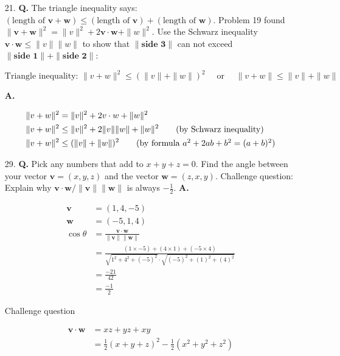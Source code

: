\documentclass[main.tex]{subfiles}
\begin{document}
\begin{enumerate}
        \item [21.] \textbf{Q.} The triangle inequality says: $(\text{length of } \bm{v} + \bm{w}) \leq ( \text{length of } \bm{v} ) + ( \text{length of } \bm{w} )$. Problem 19 found $\| \bm{v} + \bm{w} \|^2 = \|v\|^2 + 2 \bm{v} \cdot \bm{w} + \|w\|^2$. Use the Schwarz inequality $\bm{v} \cdot \bm{w} \leq \|v\| \|w\|$ to show that $\|\textbf{side 3}\|$ can not exceed $\|\textbf{side 1}\| + \|\textbf{side 2}\|$: 
        
        $$\text{Triangle inequality: }\|v+w\|^{2} \leq(\|v\|+\|w\|)^{2} \quad \text{ or } \quad\|v+w\| \leq\|v\|+\|w\|$$ 
        
        \textbf{A.}
        
        
        \begin{align*}
            \|v+w\|^{2} & = \|v\|^{2}+2 v \cdot w+\|w\|^{2} \\
            \|v+w\|^{2} & \leq \|v\|^{2}+2 \|v\|\|w\| +\|w\|^{2} \tag{by Schwarz inequality} \\
            \|v+w\|^{2} & \leq(\|v\|+\|w\|)^{2} \tag{by formula $a^{2}+2 a b+b^{2}=(a+b)^{2}$}
        \end{align*}
        
        \item [29.] \textbf{Q.} Pick any numbers that add to $x+y+z=0$. Find the angle between your vector $\bm{v}=(x, y, z)$ and the vector $\bm{w}=(z, x, y)$. Challenge question: Explain why $\bm{v} \cdot \bm{w} /\|\bm{v}\|\|\bm{w}\|$ is always $-\frac{1}{2}$. \textbf{A.} 
        
        \begin{align*}
            \bm{v} & = (1, 4, -5) \\
            \bm{w} & = (-5, 1, 4) \\
            \cos \theta & = \frac{\bm{v} \cdot \bm{w}}{\|\bm{v}\|\|\bm{w}\|} \\
                        & = \frac{(1 \times-5)+(4 \times 1)+(-5 \times 4)}
                        {\sqrt{1^{2}+4^{2}+(-5)^{2}} \cdot \sqrt{(-5)^{2}+(1)^{2}+(4)^{2}}}\\
                        & = \frac{-21}{42} \\
                        & = \frac{-1}{2}
        \end{align*}
        
        Challenge question
        
        \begin{align*}
            \bm{v} \cdot \bm{w} & = x z + y z + x y \\
                                & =\frac{1}{2}(x+y+z)^{2}-\frac{1}{2}\left(x^{2}+y^{2}+z^{2}\right) \\
        \end{align*}
        
    \end{enumerate}
\end{document}
